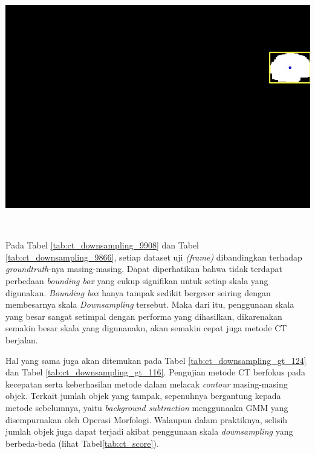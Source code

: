 \begin{longtblr}
\begin{minipage}{0.3\textwidth}
                \includegraphics[width=\linewidth]{image/9866/9866_contour_downsample_x8_m7x13_frame849.jpg}
            \end{minipage} \\ 
            \hline
        \end{longtblr}
    
    	Pada Tabel \ref{tab:ct_downsampling_9908} dan Tabel \ref{tab:ct_downsampling_9866}, setiap dataset uji \textit{(frame)} dibandingkan terhadap \textit{groundtruth}-nya masing-masing. Dapat diperhatikan bahwa tidak terdapat perbedaan \textit{bounding box} yang cukup signifikan untuk setiap skala yang digunakan. \textit{Bounding box} hanya tampak sedikit bergeser seiring dengan membesarnya skala \textit{Downsampling} tersebut. Maka dari itu, penggunaan skala yang besar sangat setimpal dengan performa yang dihasilkan, dikarenakan semakin besar skala yang digunanakn, akan semakin cepat juga metode CT berjalan. 
    	
    	Hal yang sama juga akan ditemukan pada Tabel \ref{tab:ct_downsampling_gt_124} dan Tabel \ref{tab:ct_downsampling_gt_116}. Pengujian metode CT berfokus pada kecepatan serta keberhasilan metode dalam melacak \textit{contour} masing-masing objek. Terkait jumlah objek yang tampak, sepenuhnya bergantung kepada metode sebelumnya, yaitu \textit{background subtraction} menggunaakn GMM yang disempurnakan oleh Operasi Morfologi. Walaupun dalam praktiknya, selisih jumlah objek juga dapat terjadi akibat penggunaan skala \textit{downsampling} yang berbeda-beda (lihat Tabel\ref{tab:ct_score}).
        
